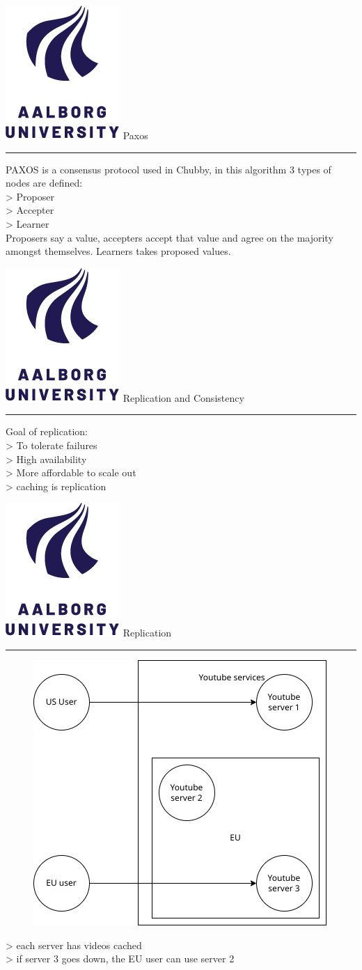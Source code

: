 \documentclass[aspectratio=1610,17pt,utf8]{beamer}
\newcommand{\mainframe}[1]{\color{blue} \includegraphics[width=.05\textwidth]{figures/aau.png} #1\\\color{black}\hrule}
\newcommand{\regularframe}[1]{\color{black}\includegraphics[width=.05\textwidth]{figures/aau.png} #1\\\hrule}
\begin{document}
\begin{frame}{\regularframe{Paxos}}
    PAXOS is a consensus protocol used in Chubby, in this algorithm 3 types of nodes are defined:\\
    > Proposer\\
    > Accepter\\
    > Learner\\
    Proposers say a value, accepters accept that value and agree on the majority amongst themselves. Learners takes proposed values.
\end{frame}


\begin{frame}{\mainframe{Replication and Consistency}}
    Goal of replication:\\
    > To tolerate failures\\
    > High availability\\
    > More affordable to scale out\\
    > caching is replication
\end{frame}

\begin{frame}{\regularframe{Replication}}
    \begin{minipage}{.45\textwidth}
        \begin{figure}
            \includegraphics[width=\textwidth]{figures/4-replication.drawio.png}
        \end{figure}
    \end{minipage}
    \begin{minipage}{.5\textwidth}
        > each server has videos cached\\
        > if server 3 goes down, the EU user can use server 2
    \end{minipage}
\end{frame}
\end{document}

